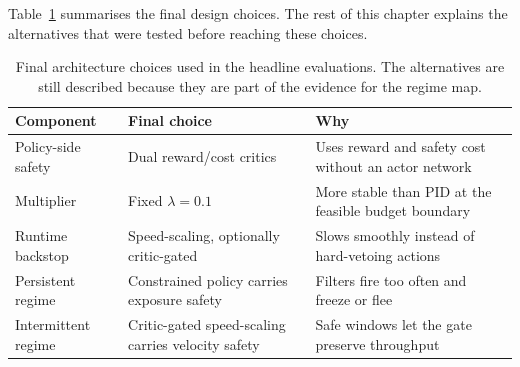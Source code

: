 \documentclass[11pt,a4paper]{report}
\begin{document}
Table~\ref{tab:method-final-choices} summarises the final design
choices. The rest of this chapter explains the alternatives that were
tested before reaching these choices.

\begin{table}[htbp]
\centering
\small
\caption{Final architecture choices used in the headline evaluations.
The alternatives are still described because they are part of the
evidence for the regime map.}
\label{tab:method-final-choices}
\begin{tabular}{lll}
\toprule
Component & Final choice & Why \\
\midrule
Policy-side safety & Dual reward/cost critics & Uses reward and safety cost without an actor network \\
Multiplier & Fixed $\lambda = 0.1$ & More stable than PID at the feasible budget boundary \\
Runtime backstop & Speed-scaling, optionally critic-gated & Slows smoothly instead of hard-vetoing actions \\
Persistent regime & Constrained policy carries exposure safety & Filters fire too often and freeze or flee \\
Intermittent regime & Critic-gated speed-scaling carries velocity safety & Safe windows let the gate preserve throughput \\
\bottomrule
\end{tabular}
\end{table}
\end{document}
